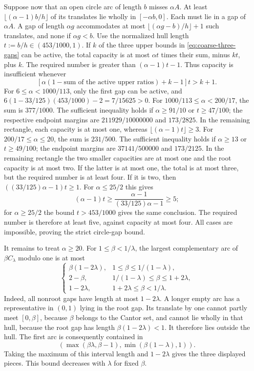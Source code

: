 Suppose now that an open circle arc of length $b$ misses $\alpha A$.
At least $\lfloor(\alpha-1)b/h\rfloor$ of its translates lie wholly in
$[-\alpha b,0]$. Each must lie in a gap of $\alpha A$.
A gap of length $\alpha g$ accommodates at most
$\lfloor(\alpha g-b)/h\rfloor+1$ such translates, and none if $\alpha g<b$.
Use the normalized hull length $t:=b/h\in(453/1000,1)$.
If $k$ of the three upper bounds in \eqref{eq:coarse-three-gaps} can be active,
the total capacity is at most
$\alpha t$ times their sum, minus $kt$, plus $k$.
The required number is greater than $(\alpha-1)t-1$.
Thus capacity is insufficient whenever
\[
 [\alpha(1-\text{sum of the active upper ratios})+k-1]t>k+1.
\]
For $6\le\alpha<1000/113$, only the first gap can be active, and
$6(1-33/125)(453/1000)-2=7/15625>0$.
For $1000/113\le\alpha<200/17$, the sum is $377/1000$.
The sufficient inequality holds if $\alpha\ge91/10$ or $t\ge47/100$;
the respective endpoint margins are
$211929/10000000$ and $173/2825$.
In the remaining rectangle, each capacity is at most one, whereas
$\lfloor(\alpha-1)t\rfloor\ge3$.
For $200/17\le\alpha\le20$, the sum is $231/500$.
The sufficient inequality holds if $\alpha\ge13$ or $t\ge49/100$;
the endpoint margins are $37141/500000$ and $173/2125$.
In the remaining rectangle the two smaller capacities are at most one
and the root capacity is at most two. If the latter is at most one,
the total is at most three, but the required number is at least four.
If it is two, then $((33/125)\alpha-1)t\ge1$.
For $\alpha\le25/2$ this gives
\[
 (\alpha-1)t\ge\frac{\alpha-1}{(33/125)\alpha-1}\ge5;
\]
for $\alpha\ge25/2$ the bound $t>453/1000$ gives the same conclusion.
The required number is therefore at least five, against capacity at most four.
All cases are impossible, proving the strict circle-gap bound.

It remains to treat $\alpha\ge20$.
For $1\le\beta<1/\lambda$, the largest complementary arc of
$\beta C_\lambda$ modulo one is at most
\[
 \begin{cases}
 \beta(1-2\lambda),&1\le\beta\le1/(1-\lambda),\\
 2-\beta,&1/(1-\lambda)\le\beta\le1+2\lambda,\\
 1-2\lambda,&1+2\lambda\le\beta<1/\lambda.
 \end{cases}
\]
Indeed, all nonroot gaps have length at most $1-2\lambda$.
A longer empty arc has a representative in $(0,1)$ lying in the root gap.
Its translate by one cannot partly meet $[0,\beta]$, because $\beta$ belongs
to the Cantor set, and cannot lie wholly in that hull, because the root gap
has length $\beta(1-2\lambda)<1$. It therefore lies outside the hull.
The first arc is consequently contained in
\[
 (\max(\beta\lambda,\beta-1),\min(\beta(1-\lambda),1)).
\]
Taking the maximum of this interval length and $1-2\lambda$ gives the
three displayed pieces. This bound decreases with $\lambda$ for fixed $\beta$.

